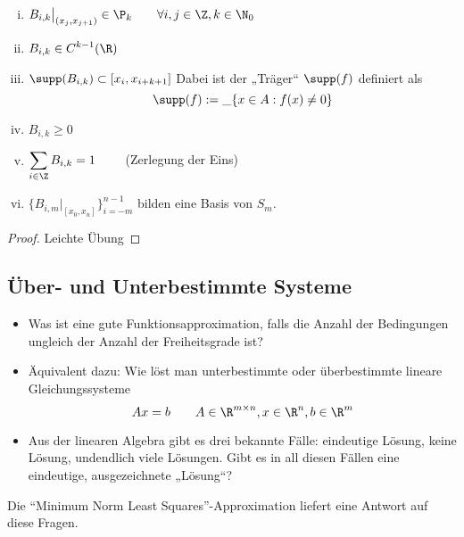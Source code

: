 \documentclass[11pt]{scrartcl}
\begin{document}
\begin{st}[Eigenschaften]
	\label{1.36}
	\begin{enumerate}[i)]
		\item
			$\displaystyle B_{i,k}\big|_{(x_j,x_{j+1})} \in \P_k \qquad \forall i,j\in \Z, k\in \N_0$
		\item
			$\displaystyle B_{i,k} \in C^{k-1}(\R)$
		\item
			$\displaystyle \supp (B_{i,k}) \subset [x_i,x_{i+k+1}]$
			Dabei ist der „Träger“ $\supp (f)$ definiert als
			\[
				\supp(f) := \_{\{x\in A : f(x) \neq 0\}}
			\]
		\item
			$\displaystyle B_{i,k} \ge 0$
		\item
			$\displaystyle \sum_{i\in \Z} B_{i,k} = 1 \qquad$ (Zerlegung der Eins)
		\item
			$\displaystyle \{B_{i,m}\big|_{[x_0,x_n]}\}_{i=-m}^{n-1}$ bilden eine Basis von $S_m$.
	\end{enumerate}
	\begin{proof}
		Leichte Übung
	\end{proof}
\end{st}


\subsection{Über- und Unterbestimmte Systeme}


\begin{itemize}
	\item
		Was ist eine gute Funktionsapproximation, falls die Anzahl der Bedingungen ungleich der Anzahl der Freiheitsgrade ist?
	\item
		Äquivalent dazu: Wie löst man unterbestimmte oder überbestimmte lineare Gleichungssysteme
		\[
			Ax=b \qquad A\in \R^{m\times n}, x\in \R^n, b\in \R^m
		\]
	\item
		Aus der linearen Algebra gibt es drei bekannte Fälle: eindeutige Lösung, keine Lösung, undendlich viele Lösungen.
		Gibt es in all diesen Fällen eine eindeutige, ausgezeichnete „Lösung“?
\end{itemize}

Die “Minimum Norm Least Squares”-Approximation liefert eine Antwort auf diese Fragen.
\end{document}

